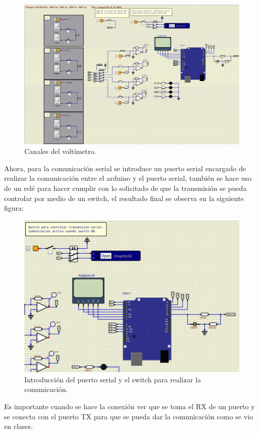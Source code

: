 \begin{figure}[H]
\centering
\includegraphics[width=.8\linewidth]{Imagenes/7.png}
 \caption{Canales del voltímetro.}
 \label{fig7}
\end{figure}
Ahora, para la comunicación serial se introduce un puerto serial encargado de realizar la comunicación entre el arduino y el puerto serial, también se hace uso de un relé para hacer cumplir con lo solicitado de que la transmisión se pueda controlar por medio de un switch, el resultado final se observa en la siguiente figura:
\begin{figure}[H]
    \centering
    \includegraphics[width=.8\linewidth]{Imagenes/8.png}
    \caption{Introducción del puerto serial y el switch para realizar la comunicación.}
    \label{figk1}
\end{figure}

Es importante cuando se hace la conexión ver que se toma el RX de un puerto y se conecta con el puerto TX para que se pueda dar la comunicación como se vio en clases.
\newpage
